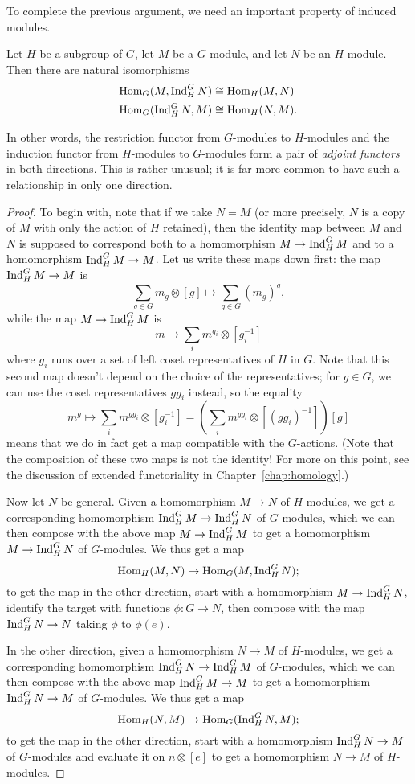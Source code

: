 To complete the previous argument, we need an important property of induced modules.
\begin{prop} \label{P:adjoint property}
Let $H$ be a subgroup of $G$, let $M$ be a $G$-module, and let $N$ be an $H$-module. Then there are natural isomorphisms
\begin{align*}
\operatorname{Hom}_G(M, \operatorname{Ind}^G_H N) &\cong \operatorname{Hom}_H(M, N) \\
\operatorname{Hom}_G(\operatorname{Ind}^G_H N, M) &\cong \operatorname{Hom}_H(N,M).
\end{align*}
\end{prop}
In other words, the restriction functor from $G$-modules to $H$-modules and the induction functor from $H$-modules to $G$-modules form a pair of \emph{adjoint functors} in both directions. This is rather unusual; it is far more common to have such a relationship in only one direction.
\begin{proof}
To begin with, note that if we take $N = M$ (or more precisely, $N$ is a copy of $M$ with only the action of $H$ retained), then the identity map between $M$ and $N$ is supposed to correspond both to a homomorphism $M \to \operatorname{Ind}^G_H M$ and to a homomorphism $\operatorname{Ind}^G_H M \to M$. Let us write these maps down first: the map $\operatorname{Ind}^G_H M \to M$ is
\[
\sum_{g \in G} m_g \otimes [g] \mapsto \sum_{g \in G} (m_g)^g,
\]
while the map $M \to \operatorname{Ind}^G_H M$ is
\[
m \mapsto \sum_i m^{g_i} \otimes [g_i^{-1}]
\]
where $g_i$ runs over a set of left coset representatives of $H$ in $G$. Note that this second map doesn't depend on the choice of the representatives; for $g \in G$, we can use the coset representatives $gg_i$ instead, so the equality
\[
m^{g} \mapsto \sum_{i} m^{gg_i} \otimes [g_i^{-1}]
= \left( \sum_{i} m^{gg_i} \otimes [(g g_i)^{-1}] \right)[g]
\]
means that we do in fact get a map compatible with the $G$-actions.
(Note that the composition of these two maps is not the identity! For more on this point, see the discussion of extended functoriality in Chapter~\ref{chap:homology}.)

Now let $N$ be general. Given a homomorphism $M \to N$ of $H$-modules, we get a corresponding homomorphism
$\operatorname{Ind}^G_H M \to \operatorname{Ind}^G_H N$ of $G$-modules, which we can then compose with the above map $M \to \operatorname{Ind}^G_H M$ to get a homomorphism $M \to \operatorname{Ind}^G_H N$ of $G$-modules. We thus get a map
\[
\operatorname{Hom}_H(M,N) \to \operatorname{Hom}_G(M, \operatorname{Ind}^G_H N);
\]
to get the map in the other direction, start with a homomorphism $M \to \operatorname{Ind}^G_H N$, identify the target with functions $\phi: G \to N$, then compose with the map $\operatorname{Ind}^G_H N \to N$ taking $\phi$ to $\phi(e)$.

In the other direction, given a homomorphism $N \to M$ of $H$-modules, we get a corresponding homomorphism
$\operatorname{Ind}^G_H N \to \operatorname{Ind}^G_H M$ of $G$-modules, which we can then compose with the above map $\operatorname{Ind}^G_H M \to M$ to get a homomorphism $\operatorname{Ind}^G_H N \to M$ of $G$-modules. 
We thus get a map
\[
\operatorname{Hom}_H(N,M) \to \operatorname{Hom}_G(\operatorname{Ind}^G_H N,M);
\]
to get the map in the other direction, start with a homomorphism $\operatorname{Ind}^G_H N \to M$ of $G$-modules and evaluate it on $n \otimes [e]$ to get a homomorphism $N \to M$ of $H$-modules.
\end{proof}

